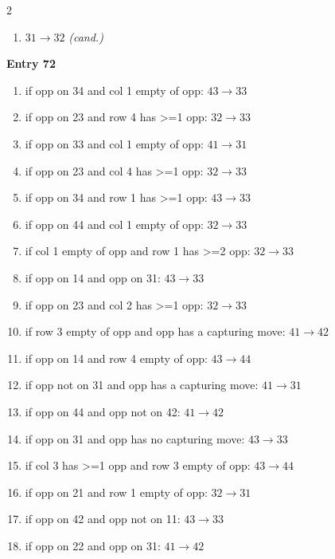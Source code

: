 \begin{multicols}{2}
\begin{tikzpicture}[scale=0.24]
\end{tikzpicture}
\nopagebreak\begin{enumerate}[topsep=1pt,itemsep=0pt,parsep=0pt,leftmargin=2.2em,label=\arabic*.]
\item $31\!\to\!32$ \hfill\textit{(cand.)}
\end{enumerate}\smallskip
\noindent\textbf{Entry 72} \; 
\nopagebreak\begin{enumerate}[topsep=1pt,itemsep=0pt,parsep=0pt,leftmargin=2.2em,label=\arabic*.]
\item if opp on 34 and col 1 empty of opp: $43\!\to\!33$
\item if opp on 23 and row 4 has >=1 opp: $32\!\to\!33$
\item if opp on 33 and col 1 empty of opp: $41\!\to\!31$
\item if opp on 23 and col 4 has >=1 opp: $32\!\to\!33$
\item if opp on 34 and row 1 has >=1 opp: $43\!\to\!33$
\item if opp on 44 and col 1 empty of opp: $32\!\to\!33$
\item if col 1 empty of opp and row 1 has >=2 opp: $32\!\to\!33$
\item if opp on 14 and opp on 31: $43\!\to\!33$
\item if opp on 23 and col 2 has >=1 opp: $32\!\to\!33$
\item if row 3 empty of opp and opp has a capturing move: $41\!\to\!42$
\item if opp on 14 and row 4 empty of opp: $43\!\to\!44$
\item if opp not on 31 and opp has a capturing move: $41\!\to\!31$
\item if opp on 44 and opp not on 42: $41\!\to\!42$
\item if opp on 31 and opp has no capturing move: $43\!\to\!33$
\item if col 3 has >=1 opp and row 3 empty of opp: $43\!\to\!44$
\item if opp on 21 and row 1 empty of opp: $32\!\to\!31$
\item if opp on 42 and opp not on 11: $43\!\to\!33$
\item if opp on 22 and opp on 31: $41\!\to\!42$

\end{enumerate}
\end{multicols}
